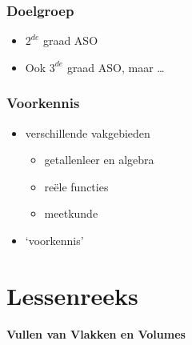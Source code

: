 \documentclass[dutch]{beamer}
\begin{document}
\begin{frame}
\begin{figure}[h]
\pause
{}
\end{figure}
\end{frame}



\begin{frame}
\frametitle{Doelgroep}
\pause
\begin{itemize}
\item $2^{de}$ graad ASO
\pause
\item Ook $3^{de}$ graad ASO\pause, maar \ldots
\end{itemize}
\end{frame}


\begin{frame}
\frametitle{Voorkennis}
\pause
\begin{itemize}
\item verschillende vakgebieden
\pause
\begin{itemize}
\item getallenleer en algebra
\item re\"{e}le functies
\item meetkunde
\end{itemize}
\pause
\item `voorkennis'
\end{itemize}
\end{frame}

\section{Lessenreeks}

\begin{frame}
\begin{center}
\textbf{\Large{Vullen van Vlakken en Volumes}}
\end{center}
\end{frame}
\end{document}
